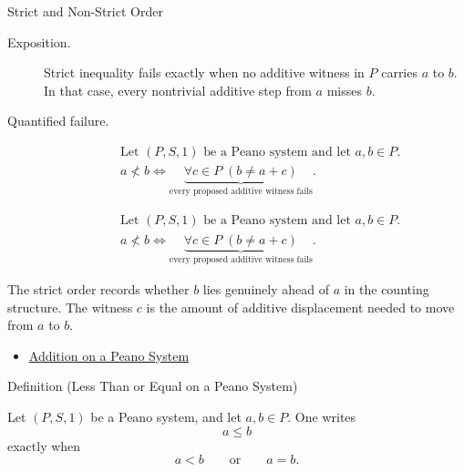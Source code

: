 \begin{topicbox}{Strict and Non-Strict Order}
\begin{remark*}
\begin{description}
  \item[Exposition.]
  Strict inequality fails exactly when no additive witness in $P$ carries
  $a$ to $b$. In that case, every nontrivial additive step from $a$ misses
  $b$.
  \item[Quantified failure.]
  \[
  \begin{aligned}
  &\text{Let } (P,S,1) \text{ be a Peano system and let } a,b \in P.\\
  &a \not< b
  \Longleftrightarrow
  \underbrace{\forall c \in P\;(b \neq a+c)}_{\text{every proposed additive witness fails}}.
  \end{aligned}
  \]

\[
  \begin{aligned}
  &\text{Let } (P,S,1) \text{ be a Peano system and let } a,b \in P.\\
  &a \not< b
  \Longleftrightarrow
  \underbrace{\forall c \in P\;(b \neq a+c)}_{\text{every proposed additive witness fails}}.
  \end{aligned}
  \]
\end{description}
\end{remark*}

\begin{remark*}[Interpretation]
The strict order records whether $b$ lies genuinely ahead of $a$ in the
counting structure. The witness $c$ is the amount of additive displacement
needed to move from $a$ to $b$.
\end{remark*}

\begin{dependencies}
\begin{itemize}
  \item \hyperref[def:addition-on-peano-system]{Addition on a Peano System}
\end{itemize}
\end{dependencies}

\begin{definitionbox}{Definition (Less Than or Equal on a Peano System)}
\begin{definition}
\label{def:less-than-or-equal-on-peano-system}
Let $(P,S,1)$ be a Peano system, and let $a,b \in P$. One writes
\[
a \le b
\]
exactly when
\[
a<b
\qquad\text{or}\qquad
a=b.
\]
\end{definition}
\end{definitionbox}


\end{topicbox}
